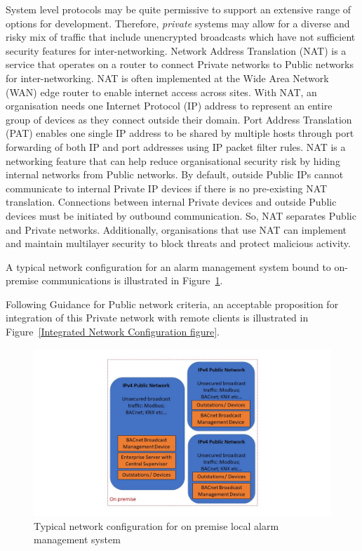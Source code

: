 \documentclass[11pt, oneside]{book}   	%
\begin{document}
System level protocols may be quite permissive to support an extensive range of options for development.
Therefore, \emph{private} systems may allow for a diverse and risky mix of traffic that include unencrypted broadcasts which have not sufficient security features for inter-networking.
Network Address Translation (NAT) is a service that operates on a router to connect Private networks to Public networks for inter-networking.
NAT is often implemented at the Wide Area Network (WAN) edge router to enable internet access across sites.
With NAT, an organisation needs one Internet Protocol (IP) address to represent an entire group of devices as they connect outside their domain.
Port Address Translation (PAT) enables one single IP address to be shared by multiple hosts through port forwarding of both IP and port addresses using IP packet filter rules.
NAT is a networking feature that can help reduce organisational security risk by hiding internal networks from Public networks.
By default, outside Public IPs cannot communicate to internal Private IP devices if there is no pre-existing NAT translation.
Connections between internal Private devices and outside Public devices must be initiated by outbound communication.
So, NAT separates Public and Private networks.
Additionally, organisations that use NAT can implement and maintain multilayer security to block threats and protect malicious activity.

A typical network configuration for an alarm management system bound to on-premise communications is illustrated in Figure~\ref{Typical Network Configuration figure}.\

Following Guidance for Public network criteria, an acceptable proposition for integration of this Private network with remote clients is illustrated in Figure~\ref{Integrated Network Configuration figure}.

\pagebreak

\FloatBarrier
\begin{figure}
\begin{center}
\includegraphics[width=1\textwidth]{typicalPrivateNetwork.jpg}
\caption{Typical network configuration for on premise local alarm management system}
\label{Typical Network Configuration figure}
\end{center}
\end{figure}
\FloatBarrier
\end{document}
